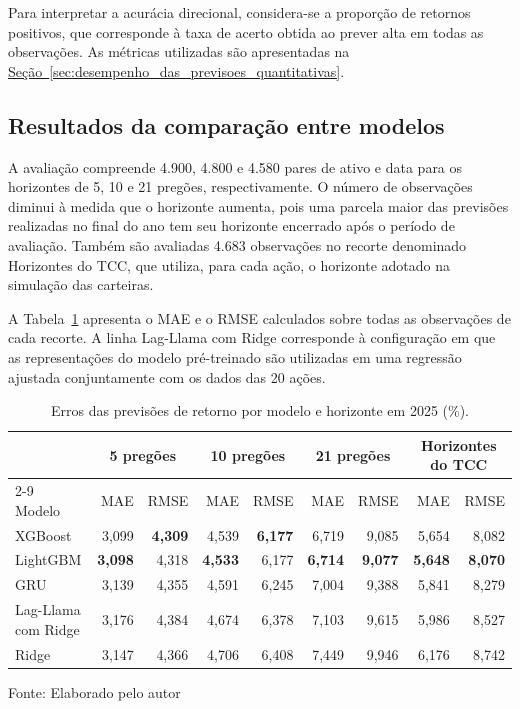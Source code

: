 Para interpretar a acurácia direcional, considera-se a proporção de retornos positivos, que corresponde à taxa de acerto obtida ao prever alta em todas as observações. As métricas utilizadas são apresentadas na \hyperref[sec:desempenho_das_previsoes_quantitativas]{Seção~\ref*{sec:desempenho_das_previsoes_quantitativas}}.

\subsection{Resultados da comparação entre modelos}
\label{sec:resultados_comparacao_modelos}

A avaliação compreende 4.900, 4.800 e 4.580 pares de ativo e data para os horizontes de 5, 10 e 21 pregões, respectivamente. O número de observações diminui à medida que o horizonte aumenta, pois uma parcela maior das previsões realizadas no final do ano tem seu horizonte encerrado após o período de avaliação. Também são avaliadas 4.683 observações no recorte denominado Horizontes do TCC, que utiliza, para cada ação, o horizonte adotado na simulação das carteiras.

A Tabela~\ref{tab:comparacao_modelos_rmse} apresenta o MAE e o RMSE calculados sobre todas as observações de cada recorte. A linha Lag-Llama com Ridge corresponde à configuração em que as representações do modelo pré-treinado são utilizadas em uma regressão ajustada conjuntamente com os dados das 20 ações.

\begin{table}[htbp]
    \centering
    \caption{Erros das previsões de retorno por modelo e horizonte em 2025 (\%).}
    \label{tab:comparacao_modelos_rmse}
    {\small
    \setlength{\tabcolsep}{4pt}
    \begin{tabular}{@{}lrrrrrrrr@{}}
        \hline
        & \multicolumn{2}{c}{5 pregões}
        & \multicolumn{2}{c}{10 pregões}
        & \multicolumn{2}{c}{21 pregões}
        & \multicolumn{2}{c}{Horizontes do TCC} \\
        \cline{2-9}
        Modelo & MAE & RMSE & MAE & RMSE & MAE & RMSE & MAE & RMSE \\
        \hline
        XGBoost             & 3,099 & \textbf{4,309} & 4,539 & \textbf{6,177} & 6,719 & 9,085 & 5,654 & 8,082 \\
        LightGBM            & \textbf{3,098} & 4,318 & \textbf{4,533} & 6,177 & \textbf{6,714} & \textbf{9,077} & \textbf{5,648} & \textbf{8,070} \\
        GRU                 & 3,139 & 4,355 & 4,591 & 6,245 & 7,004 & 9,388 & 5,841 & 8,279 \\
        Lag-Llama com Ridge & 3,176 & 4,384 & 4,674 & 6,378 & 7,103 & 9,615 & 5,986 & 8,527 \\
        Ridge               & 3,147 & 4,366 & 4,706 & 6,408 & 7,449 & 9,946 & 6,176 & 8,742 \\
        \hline
    \end{tabular}
    }
    \par\smallskip
    Fonte: Elaborado pelo autor
\end{table}

